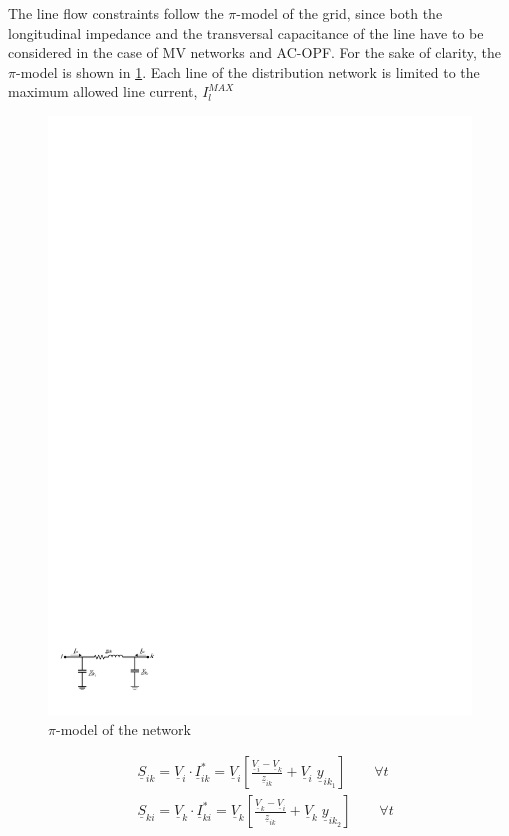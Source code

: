 The line flow constraints follow the $\pi$-model of the grid, since both the longitudinal impedance and the transversal capacitance of the line have to be considered in the case of MV networks and AC-OPF. For the sake of clarity, the $\pi$-model is shown in \ref{fig:pimodel}. Each line of the distribution network is limited to the maximum allowed line current, $I_{l}^{MAX}$

\begin{figure}[]
	\centering
	\includegraphics[width=0.7\columnwidth ]{ChapterOPF_DSO/Figures/pimodel2.pdf}
		\caption{$\pi$-model of the network}
	\label{fig:pimodel}  
\end{figure}

\begin{subequations}
\begin{align*}
& \underline{S}_{ik} = \underline{V}_{i} \cdot \underline{I}_{ik}^{*} = \underline{V}_{i} \left[ \frac{\underline{V}_{i} - \underline{V}_{k}}{\underline{z}_{ik}} + \underline{V}_{i} \; \underline{y}_{ik_1} \right]   \qquad  \forall t  \\
& \underline{S}_{ki} = \underline{V}_{k} \cdot \underline{I}_{ki}^{*} = \underline{V}_{k} \left[ \frac{\underline{V}_{k} - \underline{V}_{i}}{\underline{z}_{ik}} + \underline{V}_{k} \;  \underline{y}_{ik_2} \right]   \qquad  \forall t  
\end{align*}
\end{subequations}

